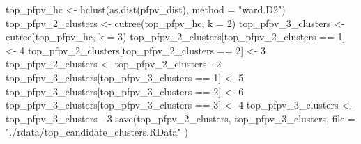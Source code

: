 \documentclass[
  11pt,
  oneside]{book}
\newenvironment{Shaded}{\begin{snugshade}}{\end{snugshade}}
\newcommand{\AttributeTok}[1]{\textcolor[rgb]{0.77,0.63,0.00}{#1}}
\newcommand{\DecValTok}[1]{\textcolor[rgb]{0.00,0.00,0.81}{#1}}
\newcommand{\FunctionTok}[1]{\textcolor[rgb]{0.00,0.00,0.00}{#1}}
\newcommand{\NormalTok}[1]{#1}
\newcommand{\OtherTok}[1]{\textcolor[rgb]{0.56,0.35,0.01}{#1}}
\newcommand{\SpecialCharTok}[1]{\textcolor[rgb]{0.00,0.00,0.00}{#1}}
\newcommand{\StringTok}[1]{\textcolor[rgb]{0.31,0.60,0.02}{#1}}
\begin{document}
\begin{Shaded}
\begin{Highlighting}[]
\NormalTok{top\_pfpv\_hc }\OtherTok{\textless{}{-}} \FunctionTok{hclust}\NormalTok{(}\FunctionTok{as.dist}\NormalTok{(pfpv\_dist), }\AttributeTok{method =} \StringTok{"ward.D2"}\NormalTok{)}
\NormalTok{top\_pfpv\_2\_clusters }\OtherTok{\textless{}{-}} \FunctionTok{cutree}\NormalTok{(top\_pfpv\_hc, }\AttributeTok{k =} \DecValTok{2}\NormalTok{)}
\NormalTok{top\_pfpv\_3\_clusters }\OtherTok{\textless{}{-}} \FunctionTok{cutree}\NormalTok{(top\_pfpv\_hc, }\AttributeTok{k =} \DecValTok{3}\NormalTok{)}
\NormalTok{top\_pfpv\_2\_clusters[top\_pfpv\_2\_clusters }\SpecialCharTok{==} \DecValTok{1}\NormalTok{] }\OtherTok{\textless{}{-}} \DecValTok{4}
\NormalTok{top\_pfpv\_2\_clusters[top\_pfpv\_2\_clusters }\SpecialCharTok{==} \DecValTok{2}\NormalTok{] }\OtherTok{\textless{}{-}} \DecValTok{3}
\NormalTok{top\_pfpv\_2\_clusters }\OtherTok{\textless{}{-}}\NormalTok{ top\_pfpv\_2\_clusters }\SpecialCharTok{{-}} \DecValTok{2}
\NormalTok{top\_pfpv\_3\_clusters[top\_pfpv\_3\_clusters }\SpecialCharTok{==} \DecValTok{1}\NormalTok{] }\OtherTok{\textless{}{-}} \DecValTok{5}
\NormalTok{top\_pfpv\_3\_clusters[top\_pfpv\_3\_clusters }\SpecialCharTok{==} \DecValTok{2}\NormalTok{] }\OtherTok{\textless{}{-}} \DecValTok{6}
\NormalTok{top\_pfpv\_3\_clusters[top\_pfpv\_3\_clusters }\SpecialCharTok{==} \DecValTok{3}\NormalTok{] }\OtherTok{\textless{}{-}} \DecValTok{4}
\NormalTok{top\_pfpv\_3\_clusters }\OtherTok{\textless{}{-}}\NormalTok{ top\_pfpv\_3\_clusters }\SpecialCharTok{{-}} \DecValTok{3}
\FunctionTok{save}\NormalTok{(top\_pfpv\_2\_clusters, top\_pfpv\_3\_clusters,}
  \AttributeTok{file =} \StringTok{"./rdata/top\_candidate\_clusters.RData"}
\NormalTok{)}
\end{Highlighting}
\end{Shaded}
\end{document}
